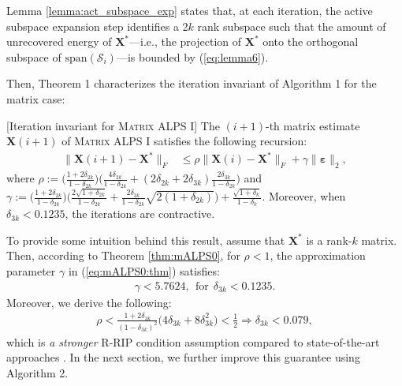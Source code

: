 \documentclass[twocolumn]{svjour3}
\newcommand{\vectornormbig}[1]{\big\|#1\big\|}
\newcommand{\signal}{\boldsymbol{X}}
\newcommand{\bestsignal}{\boldsymbol{X}^\ast}
\newcommand{\noise}{\boldsymbol{\varepsilon}}
\newcommand{\rank}{k}
\begin{document}
Lemma \ref{lemma:act_subspace_exp} states that, at each iteration, the active subspace expansion step identifies a 2$ \rank $ rank subspace such that the amount of unrecovered energy of $ \bestsignal $---i.e., the projection of $ \bestsignal $ onto the orthogonal subspace of $ \text{span}(\mathcal{S}_i) $---is bounded by (\ref{eq:lemma6}).

Then, Theorem 1 characterizes the iteration invariant of Algorithm 1 for the matrix case:
\begin{theorem}\label{thm:mALPS0}[Iteration invariant for \textsc{Matrix ALPS I}] The $(i+1)$-th matrix estimate $\signal(i+1)$ of \textsc{Matrix ALPS I} satisfies the following recursion:
\begin{align}
\vectornormbig{\signal(i+1) - \bestsignal}_F &\leq \rho \vectornormbig{\signal(i) - \bestsignal}_F + \gamma \vectornormbig{\noise}_2, \label{eq:mALPS0:thm}
\end{align} where $ \rho:= \Big( \frac{1 + 2\delta_{2\rank}}{1-\delta_{2\rank}}\Big)\Big(\frac{4\delta_{2\rank}}{1-\delta_{2\rank}} + (2\delta_{2\rank} + 2\delta_{3\rank})\frac{2\delta_{3\rank}}{1-\delta_{2\rank}}\Big) $ and $\gamma := \Big( \frac{1 + 2\delta_{2\rank}}{1-\delta_{2\rank}}\Big)\Big(\frac{2\sqrt{1+\delta_{2\rank}}}{1 - \delta_{2\rank}} + \frac{2\delta_{3\rank}}{1-\delta_{2\rank}}  \sqrt{2(1+\delta_{2\rank})}\Big) + \frac{\sqrt{1+\delta_{\rank}}}{1-\delta_{\rank}}.$ Moreover, when $\delta_{3\rank} < 0.1235$, the iterations are contractive.
\end{theorem}

To provide some intuition behind this result, assume that $ \bestsignal $ is a rank-$ \rank $ matrix. Then, according to Theorem \ref{thm:mALPS0}, for $ \rho < 1 $, the approximation parameter $ \gamma $ in (\ref{eq:mALPS0:thm}) satisfies:
\begin{align}
\gamma < 5.7624, ~~\text{for}~~ \delta_{3\rank} < 0.1235. \nonumber 
\end{align} Moreover, we derive the following:
\begin{align}
\rho < \frac{1+2\delta_{3\rank}}{(1-\delta_{3\rank})^2} \big( 4\delta_{3\rank} + 8 \delta_{3\rank}^2\big) < \frac{1}{2} \Rightarrow \delta_{3\rank} < 0.079, \nonumber
\end{align} which is {\it a stronger} R-RIP condition assumption compared to state-of-the-art approaches \cite{admira2010}. In the next section, we further improve this guarantee using Algorithm 2.
\end{document}
